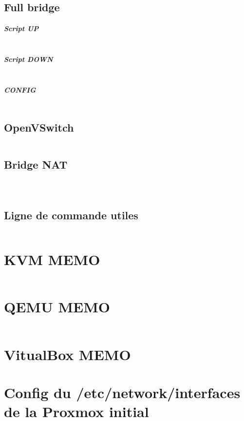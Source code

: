 \documentclass[french]{article}
\begin{document}
\subsection{Full bridge}
\subparagraph{Script UP }
\inputminted{bash}{script/LXC/fb-up.sh}
\subparagraph{Script DOWN }
\inputminted{bash}{script/LXC/fb-down.sh}
\subparagraph{CONFIG }
\inputminted{bash}{script/LXC/config_lxc_FB}

\subsection{OpenVSwitch}

\inputminted{bash}{script/LXC/command_b_openvSwitch}

\subsection{Bridge NAT}
\inputminted{bash}{script/LXC/config_lxc_BN}
\inputminted{bash}{script/LXC/bn-up.sh}
\inputminted{bash}{script/LXC/bn-down.sh}


\subsection{Ligne de commande utiles}
\inputminted{bash}{script/LXC/lxc_cl_usefull}
\section{KVM MEMO}
\inputminted{bash}{script/KVM/kvm_cl_utils}
\section{QEMU MEMO}
\inputminted{bash}{script/QEMU/gestDisk.txt}
\section{VitualBox MEMO}

\section{Config du /etc/network/interfaces de la Proxmox initial}
\inputminted{bash}{config.txt}


\newpage
\begin{thebibliography}{9}

 
  
      
\end{thebibliography}
\end{document}
